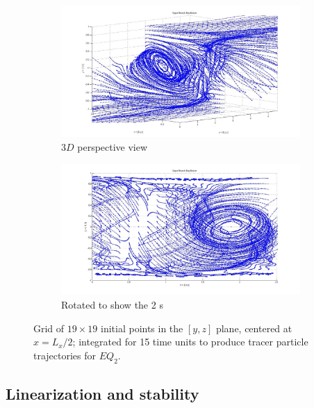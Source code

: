 \documentclass[lineno]{jfm}
\begin{document}
\begin{figure}[!h]
\centering
    \begin{subfigure}{0.98\textwidth}
    \includegraphics[width=1.0\textwidth]{fig_UB1.jpg}
      \caption{
        $3D$ perspective view
       }
      \label{fig:UBs_a}
    \end{subfigure}

    \begin{subfigure}{0.98\textwidth}
    \includegraphics[width=1.0\textwidth]{fig_UB1eq.jpg}
      \caption{
        Rotated to show the 2 \stagp s
       }
      \label{fig:UBs_b}
    \end{subfigure}
    \caption{
Grid of $19 \times 19$  initial points in the $[y,z]$ plane, centered at 
$x = L_x/2$; integrated for 15 time units to produce tracer particle 
trajectories for $EQ_2$.} 
\label{fig:UBs}
 \end{figure}


\subsection{Linearization and stability}
\end{document}
